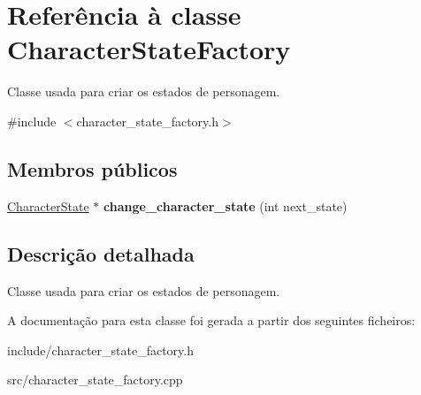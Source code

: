 \hypertarget{classCharacterStateFactory}{}\section{Referência à classe Character\+State\+Factory}
\label{classCharacterStateFactory}


Classe usada para criar os estados de personagem.  




{\ttfamily \#include $<$character\+\_\+state\+\_\+factory.\+h$>$}

\subsection*{Membros públicos}
\begin{DoxyCompactItemize}
\item 
\mbox{\label{classCharacterStateFactory_abd27e3ed7f361a8e16bdded0de870102}} 
\mbox{\hyperlink{classCharacterState}{Character\+State}} $\ast$ {\bfseries change\+\_\+character\+\_\+state} (int next\+\_\+state)
\end{DoxyCompactItemize}


\subsection{Descrição detalhada}
Classe usada para criar os estados de personagem. 

A documentação para esta classe foi gerada a partir dos seguintes ficheiros\+:\begin{DoxyCompactItemize}
\item 
include/character\+\_\+state\+\_\+factory.\+h\item 
src/character\+\_\+state\+\_\+factory.\+cpp\end{DoxyCompactItemize}
